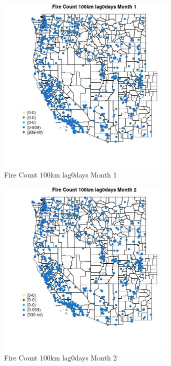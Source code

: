 \begin{figure} 
\centering  
\includegraphics[width=0.77\textwidth]{Code_Outputs/Report_ML_input_PM25_Step4_part_e_de_duplicated_aves_compiled_2019-05-21wNAs_MapObsMo1Fire_Count_100km_lag0days.jpg} 
\caption{\label{fig:Report_ML_input_PM25_Step4_part_e_de_duplicated_aves_compiled_2019-05-21wNAsMapObsMo1Fire_Count_100km_lag0days}Fire Count 100km lag0days Month 1} 
\end{figure} 
 

\begin{figure} 
\centering  
\includegraphics[width=0.77\textwidth]{Code_Outputs/Report_ML_input_PM25_Step4_part_e_de_duplicated_aves_compiled_2019-05-21wNAs_MapObsMo2Fire_Count_100km_lag0days.jpg} 
\caption{\label{fig:Report_ML_input_PM25_Step4_part_e_de_duplicated_aves_compiled_2019-05-21wNAsMapObsMo2Fire_Count_100km_lag0days}Fire Count 100km lag0days Month 2} 
\end{figure} 
 

